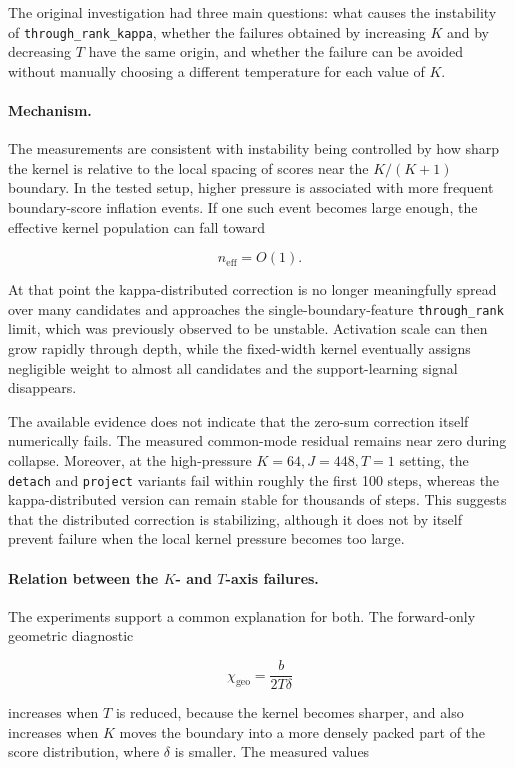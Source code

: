 \documentclass[11pt,a4paper]{article}
\newcommand{\code}[1]{\texttt{#1}}
\newcommand{\neff}{n_{\mathrm{eff}}}
\newcommand{\chigeo}{\chi_{\mathrm{geo}}}
\begin{document}
The original investigation had three main questions: what causes the
instability of \code{through\_rank\_kappa}, whether the failures obtained by
increasing \(K\) and by decreasing \(T\) have the same origin, and whether the
failure can be avoided without manually choosing a different temperature for
each value of \(K\).

\paragraph{Mechanism.}
The measurements are consistent with instability being controlled by how sharp
the kernel is relative to the local spacing of scores near the
\(K/(K+1)\) boundary. In the tested setup, higher pressure is associated with
more frequent boundary-score inflation events. If one such event becomes large
enough, the effective kernel population can fall toward

\[
\neff = O(1).
\]

At that point the kappa-distributed correction is no longer meaningfully
spread over many candidates and approaches the single-boundary-feature
\code{through\_rank} limit, which was previously observed to be unstable.
Activation scale can then grow rapidly through depth, while the fixed-width
kernel eventually assigns negligible weight to almost all candidates and the
support-learning signal disappears.

The available evidence does not indicate that the zero-sum correction itself
numerically fails. The measured common-mode residual remains near zero during
collapse. Moreover, at the high-pressure \(K=64,J=448,T=1\) setting, the
\code{detach} and \code{project} variants fail within roughly the first 100
steps, whereas the kappa-distributed version can remain stable for thousands of
steps. This suggests that the distributed correction is stabilizing, although
it does not by itself prevent failure when the local kernel pressure becomes
too large.

\paragraph{Relation between the \(K\)- and \(T\)-axis failures.}
The experiments support a common explanation for both. The forward-only
geometric diagnostic

\[
\chigeo
=
\frac{b}{2T\delta}
\]

increases when \(T\) is reduced, because the kernel becomes sharper, and also
increases when \(K\) moves the boundary into a more densely packed part of the
score distribution, where \(\delta\) is smaller. The measured values
\end{document}
